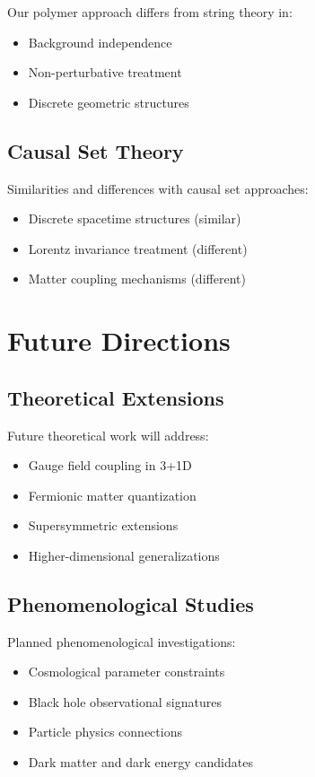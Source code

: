 \documentclass[11pt]{article}
\begin{document}
Our polymer approach differs from string theory in:
\begin{itemize}
\item Background independence
\item Non-perturbative treatment
\item Discrete geometric structures
\end{itemize}

\subsection{Causal Set Theory}

Similarities and differences with causal set approaches:
\begin{itemize}
\item Discrete spacetime structures (similar)
\item Lorentz invariance treatment (different)
\item Matter coupling mechanisms (different)
\end{itemize}

\section{Future Directions}

\subsection{Theoretical Extensions}

Future theoretical work will address:
\begin{itemize}
\item Gauge field coupling in 3+1D
\item Fermionic matter quantization
\item Supersymmetric extensions
\item Higher-dimensional generalizations
\end{itemize}

\subsection{Phenomenological Studies}

Planned phenomenological investigations:
\begin{itemize}
\item Cosmological parameter constraints
\item Black hole observational signatures
\item Particle physics connections
\item Dark matter and dark energy candidates
\end{itemize}
\end{document}
